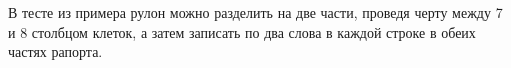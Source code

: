 В тесте из примера рулон можно разделить на две части, проведя черту между 7 и 8 столбцом клеток, а затем записать по два слова в каждой строке в обеих частях  рапорта.